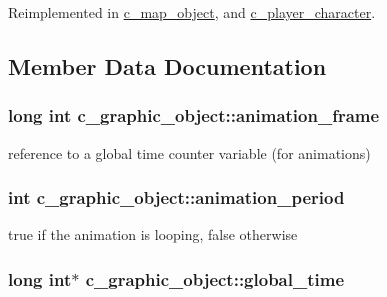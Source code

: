 Reimplemented in \hyperlink{classc__map__object_a2df801781fdad9a4b42a78ff5b9c8558}{c\-\_\-map\-\_\-object}, and \hyperlink{classc__player__character_aa5d59edcb370d29b83ac0b2659ab0385}{c\-\_\-player\-\_\-character}.



\subsection{Member Data Documentation}
\hypertarget{classc__graphic__object_a327008d33c50fe3665514770eaaaeb11}{
\subsubsection[{animation\-\_\-frame}]{\setlength{\rightskip}{0pt plus 5cm}long int c\-\_\-graphic\-\_\-object\-::animation\-\_\-frame\hspace{0.3cm}{\ttfamily [protected]}}}\label{classc__graphic__object_a327008d33c50fe3665514770eaaaeb11}
reference to a global time counter variable (for animations) \hypertarget{classc__graphic__object_a20a3a703402913137adead51faa53e79}{
\subsubsection[{animation\-\_\-period}]{\setlength{\rightskip}{0pt plus 5cm}int c\-\_\-graphic\-\_\-object\-::animation\-\_\-period\hspace{0.3cm}{\ttfamily [protected]}}}\label{classc__graphic__object_a20a3a703402913137adead51faa53e79}
true if the animation is looping, false otherwise \hypertarget{classc__graphic__object_a9ff91aa7a60272a8f713ff011a0cc0bb}{
\subsubsection[{global\-\_\-time}]{\setlength{\rightskip}{0pt plus 5cm}long int$\ast$ c\-\_\-graphic\-\_\-object\-::global\-\_\-time\hspace{0.3cm}{\ttfamily [protected]}}}\label{classc__graphic__object_a9ff91aa7a60272a8f713ff011a0cc0bb}
